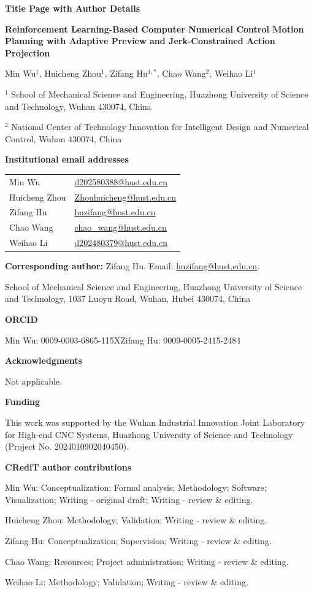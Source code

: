 \documentclass[10pt,a4paper]{article}
\begin{document}
{\large\bfseries Title Page with Author Details}\par
\textbf{Reinforcement Learning-Based Computer Numerical Control Motion Planning with Adaptive Preview and Jerk-Constrained Action Projection}

Min Wu$^{1}$, Huicheng Zhou$^{1}$, Zifang Hu$^{1,*}$, Chao Wang$^{2}$, Weihao Li$^{1}$

$^{1}$ School of Mechanical Science and Engineering, Huazhong University of Science and Technology, Wuhan 430074, China

$^{2}$ National Center of Technology Innovation for Intelligent Design and Numerical Control, Wuhan 430074, China

\textbf{Institutional email addresses}\par
\begin{tabular}{@{}ll@{}}
Min Wu & \href{mailto:d202580388@hust.edu.cn}{d202580388@hust.edu.cn}\\
Huicheng Zhou & \href{mailto:Zhouhuicheng@hust.edu.cn}{Zhouhuicheng@hust.edu.cn}\\
Zifang Hu & \href{mailto:huzifang@hust.edu.cn}{huzifang@hust.edu.cn}\\
Chao Wang & \href{mailto:chao_wang@hust.edu.cn}{chao\_wang@hust.edu.cn}\\
Weihao Li & \href{mailto:d202480379@hust.edu.cn}{d202480379@hust.edu.cn}\\
\end{tabular}

\textbf{Corresponding author:} Zifang Hu. Email: \href{mailto:huzifang@hust.edu.cn}{huzifang@hust.edu.cn}.\par
School of Mechanical Science and Engineering, Huazhong University of Science and Technology, 1037 Luoyu Road, Wuhan, Hubei 430074, China

\textbf{ORCID}\par
Min Wu: 0009-0003-6865-115X\quad Zifang Hu: 0009-0005-2415-2484

\textbf{Acknowledgments}\par Not applicable.

\textbf{Funding}\par This work was supported by the Wuhan Industrial Innovation Joint Laboratory for High-end CNC Systems, Huazhong University of Science and Technology (Project No. 2024010902040450).

\textbf{CRediT author contributions}\par
Min Wu: Conceptualization; Formal analysis; Methodology; Software; Visualization; Writing - original draft; Writing - review \& editing.

Huicheng Zhou: Methodology; Validation; Writing - review \& editing.

Zifang Hu: Conceptualization; Supervision; Writing - review \& editing.

Chao Wang: Resources; Project administration; Writing - review \& editing.

Weihao Li: Methodology; Validation; Writing - review \& editing.
\end{document}
